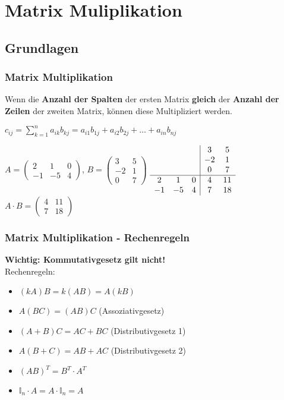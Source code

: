\section{Matrix Muliplikation}
\subsection{Grundlagen}
\begin{frame}
\frametitle{Matrix Multiplikation}
Wenn die \textbf{Anzahl der Spalten} der ersten Matrix \textbf{gleich} der \textbf{Anzahl der Zeilen} der zweiten Matrix, können diese Multipliziert werden.

$c_{ij} = \sum_{k=1}^n a_{ik}b_{kj}= a_{i1}b_{1j} + a_{i2}b_{2j} + \dots + a_{in}b_{nj}$

$ A = \begin{pmatrix} 2 & 1 & 0 \\ -1 & -5 & 4 \end{pmatrix} $,
$ B = \begin{pmatrix} 3 & 5 \\ -2 & 1 \\ 0 & 7 \end{pmatrix} $
$
\begin{array}{c c c|c c}
& & & 3 & 5\\
& & & -2 & 1\\
& & & 0 & 7\\
\hline
2 & 1 & 0 & 4 & 11\\
-1 & -5 & 4 & 7 & 18\\
\end{array}
$
$ A \cdot B = \begin{pmatrix} 4 & 11 \\ 7 & 18 \end{pmatrix} $
\end{frame}

\begin{frame}
\frametitle{Matrix Multiplikation - Rechenregeln}
\textbf{Wichtig: Kommutativgesetz gilt nicht!}\\
Rechenregeln:
\begin{itemize}
\item $(kA)B = k(AB) = A(kB)$
\item $A(BC) = (AB)C$ (Assoziativgesetz)
\item $(A+B)C = AC + BC$ (Distributivgesetz 1)
\item $A(B+C) = AB + AC$ (Distributivgesetz 2)
\item $(AB)^T = B^T \cdot A^T$
\item $\mathbb{I}_n\cdot A = A\cdot \mathbb{I}_n = A$
\end{itemize}
\end{frame}

